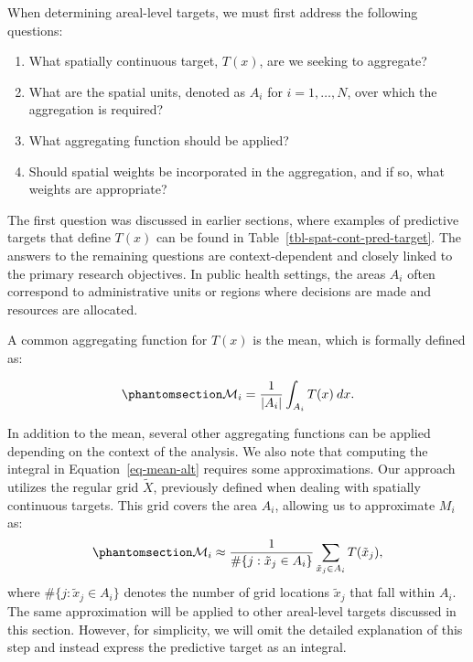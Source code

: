 \documentclass[
  letterpaper,
]{krantz}
\providecommand{\tightlist}{%
  \setlength{\itemsep}{0pt}\setlength{\parskip}{0pt}}
\begin{document}
When determining areal-level targets, we must first address the
following questions:

\begin{enumerate}
\def\labelenumi{\arabic{enumi}.}
\tightlist
\item
  What spatially continuous target, \(T(x)\), are we seeking to
  aggregate?
\item
  What are the spatial units, denoted as \(A_i\) for
  \(i = 1, \dots, N\), over which the aggregation is required?
\item
  What aggregating function should be applied?
\item
  Should spatial weights be incorporated in the aggregation, and if so,
  what weights are appropriate?
\end{enumerate}

The first question was discussed in earlier sections, where examples of
predictive targets that define \(T(x)\) can be found in
Table~\ref{tbl-spat-cont-pred-target}. The answers to the remaining
questions are context-dependent and closely linked to the primary
research objectives. In public health settings, the areas \(A_i\) often
correspond to administrative units or regions where decisions are made
and resources are allocated.

A common aggregating function for \(T(x)\) is the mean, which is
formally defined as:

\begin{equation}\phantomsection\label{eq-mean-alt}{
\mathcal{M}_i = \frac{1}{|A_i|}\int_{A_i} T(x) \: dx.
}\end{equation}

In addition to the mean, several other aggregating functions can be
applied depending on the context of the analysis. We also note that
computing the integral in Equation~\ref{eq-mean-alt} requires some
approximations. Our approach utilizes the regular grid \(\tilde{X}\),
previously defined when dealing with spatially continuous targets. This
grid covers the area \(A_i\), allowing us to approximate \(M_i\) as:
\begin{equation}\phantomsection\label{eq-mean-alt-approx}{\mathcal{M}_i \approx \frac{1}{\#\{j : \tilde{x}_j \in A_i\}} \sum_{\tilde{x}_j \in A_i} T(\tilde{x}_j), }\end{equation}
where \(\#\{j : \tilde{x}_j \in A_i\}\) denotes the number of grid
locations \(\tilde{x}_j\) that fall within \(A_i\). The same
approximation will be applied to other areal-level targets discussed in
this section. However, for simplicity, we will omit the detailed
explanation of this step and instead express the predictive target as an
integral.
\end{document}
